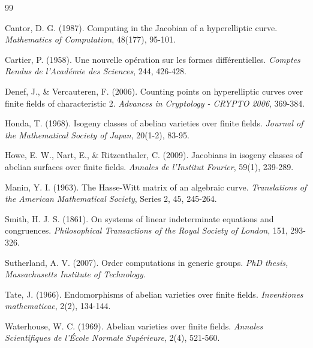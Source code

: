 \documentclass[12pt]{article}
\begin{document}
\begin{thebibliography}{99}

Cantor, D. G. (1987). Computing in the Jacobian of a hyperelliptic curve. \textit{Mathematics of Computation}, 48(177), 95-101.

Cartier, P. (1958). Une nouvelle op\'{e}ration sur les formes diff\'{e}rentielles. \textit{Comptes Rendus de l'Acad\'{e}mie des Sciences}, 244, 426-428.

Denef, J., \& Vercauteren, F. (2006). Counting points on hyperelliptic curves over finite fields of characteristic 2. \textit{Advances in Cryptology - CRYPTO 2006}, 369-384.

Honda, T. (1968). Isogeny classes of abelian varieties over finite fields. \textit{Journal of the Mathematical Society of Japan}, 20(1-2), 83-95.

Howe, E. W., Nart, E., \& Ritzenthaler, C. (2009). Jacobians in isogeny classes of abelian surfaces over finite fields. \textit{Annales de l'Institut Fourier}, 59(1), 239-289.

Manin, Y. I. (1963). The Hasse-Witt matrix of an algebraic curve. \textit{Translations of the American Mathematical Society}, Series 2, 45, 245-264.

Smith, H. J. S. (1861). On systems of linear indeterminate equations and congruences. \textit{Philosophical Transactions of the Royal Society of London}, 151, 293-326.

Sutherland, A. V. (2007). Order computations in generic groups. \textit{PhD thesis, Massachusetts Institute of Technology}.

Tate, J. (1966). Endomorphisms of abelian varieties over finite fields. \textit{Inventiones mathematicae}, 2(2), 134-144.

Waterhouse, W. C. (1969). Abelian varieties over finite fields. \textit{Annales Scientifiques de l'\'{E}cole Normale Sup\'{e}rieure}, 2(4), 521-560.

\end{thebibliography}
\end{document}
